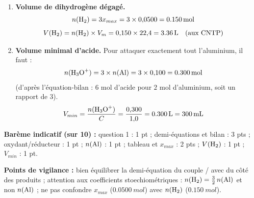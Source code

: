 \documentclass[11pt]{article}
\begin{document}
\begin{corrige}
\begin{enumerate}
Aluminium limitant : $0{,}100 - 2x_{max} = 0 \Rightarrow x_{max} = \SI{0,0500}{mol}$.

\item \textbf{Volume de dihydrogène dégagé.}
\[ n(\ce{H2}) = 3x_{max} = 3 \times 0{,}0500 = \SI{0,150}{mol} \]
\[ V(\ce{H2}) = n(\ce{H2}) \times V_m = 0{,}150 \times 22{,}4 = \SI{3,36}{L} \quad \text{(aux CNTP)} \]

\item \textbf{Volume minimal d'acide.} Pour attaquer exactement tout l'aluminium, il faut :
\[ n(\ce{H3O+}) = 3 \times n(\ce{Al}) = 3 \times 0{,}100 = \SI{0,300}{mol} \]
(d'après l'équation-bilan : $6$ mol d'acide pour $2$ mol d'aluminium, soit un rapport de $3$).
\[ V_{min} = \frac{n(\ce{H3O+})}{C} = \frac{0{,}300}{1{,}0} = \SI{0,300}{L} = \SI{300}{mL} \]
\end{enumerate}

\textbf{Barème indicatif (sur 10) :} question 1 : 1 pt ; demi-équations et bilan : 3 pts ; oxydant/réducteur : 1 pt ; $n(\ce{Al})$ : 1 pt ; tableau et $x_{max}$ : 2 pts ; $V(\ce{H2})$ : 1 pt ; $V_{min}$ : 1 pt.

\textbf{Points de vigilance :} bien équilibrer la demi-équation du couple / avec  du côté des produits ; attention aux coefficients stoechiométriques : $n(\ce{H2}) = \frac{3}{2}\,n(\ce{Al})$ et non $n(\ce{Al})$ ; ne pas confondre $x_{max}$ ($\SI{0,0500}{mol}$) avec $n(\ce{H2})$ ($\SI{0,150}{mol}$).
\end{corrige}
\end{document}

